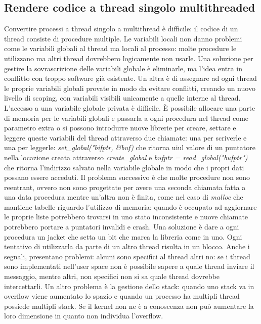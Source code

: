 \subsection{Rendere codice a thread singolo multithreaded}
Convertire processi a thread singolo a multithread \`e difficile: il codice di un thread consiste di procedure multiple. Le variabili locali non danno problemi come le variabili globali
al thread ma locali al processo: molte procedure le utilizzano ma altri thread dovrebbero logicamente non usarle. Una soluzione per gestire la sovrascrizione delle variabili globale \`e
eliminarle, ma l'idea entra in conflitto con troppo software gi\`a esistente. Un altra \`e di assegnare ad ogni thread le proprie variabili globali provate in modo da evitare conflitti,
creando un nuovo livello di scoping, con variabili visibili unicamente a quelle interne al thread. L'accesso a una variabile globale privata \`e difficile. \`E possibile allocare una
parte di memoria per le variabili globali e passarla a ogni procedura nel thread come parametro extra o si possono introdurre nuove librerie per creare, settare e leggere queste
variabili del thread attraverso due chiamate: una per scriverle e una per leggerle: \emph{set\_global("bifptr, \&buf)} che ritorna uiul valore di un puntatore nella locazione creata
attraverso \emph{create\_global} e \emph{bufptr = read\_global("bufptr")} che ritorna l'indirizzo salvato nella variabile globale in modo che i propri dati possano essere acceduti. Il
problema successivo \`e che molte procedure non sono reentrant, ovvero non sono progettate per avere una seconda chiamata fatta a una data procedura mentre un'altra non \`e finita, come
nel caso di \emph{malloc} che mantiene tabelle riguardo l'utilizzo di memoria: quando \`e occupato ad aggiornare le proprie liste potrebbero trovarsi in uno stato inconsistente e nuove
chiamate potrebbero portare a puntatori invalidi e crash. Una soluzione \`e dare a ogni procedura un jacket che setta un bit che marca la libreria come in uno. Ogni tentativo di
utilizzarla da parte di un altro thread risulta in un blocco. Anche i segnali, presentano problemi: alcuni sono specifici al thread altri no: se i thread sono implementati nell'user
space non \`e possibile sapere a quale thread inviare il messaggio, mentre altri, non specifici non si sa quale thread dovrebbe intercettarli. Un altro problema \`e la gestione dello
stack: quando uno stack va in overflow viene aumentato lo spazio e quando un processo ha multipli thread possiede multipli stack. Se il kernel non ne \`e a conoscenza non pu\`o aumentare
la loro dimensione in quanto non individua l'overflow.

